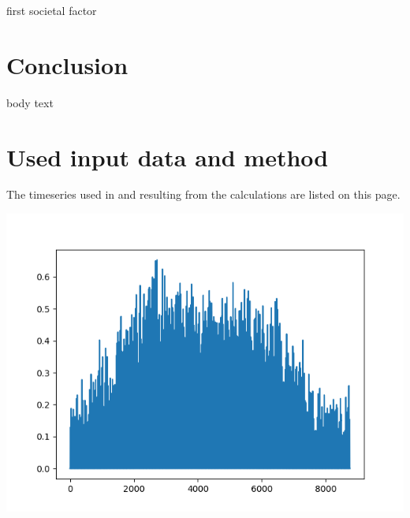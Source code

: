 \documentclass{article}
\begin{document}
\begin{multicols*}{2}
first societal factor

\section*{Conclusion}

body text

\newpage 

\appendix

\section*{Used input data and method}

The timeseries used in and resulting from the calculations are listed on this page.

\begin{center}

\includegraphics[width=\linewidth]{per_unit_pv_generation.png}

\end{center}






\begin{center}


\end{center}
\end{multicols*}
\end{document}
